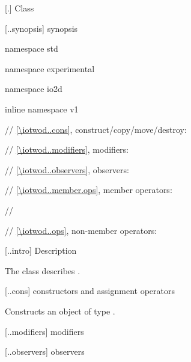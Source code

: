  [\iotwod.] {Class \tcode{}}

 [\iotwod..synopsis] {\tcode{} synopsis}

\begin{codeblock}
namespace std { namespace experimental { namespace io2d { inline namespace v1 {
    // \ref{\iotwod..cons}, construct/copy/move/destroy:

    // \ref{\iotwod..modifiers}, modifiers:
    
    // \ref{\iotwod..observers}, observers:
    
    // \ref{\iotwod..member.ops}, member operators:
    
// \expos
  
  // \ref{\iotwod..ops}, non-member operators:
} } } }
\end{codeblock}

 [\iotwod..intro] {\tcode{} Description}

\pnum
\indexlibrary{\idxcode{}}
The class \tcode{} describes .

 [\iotwod..cons] {\tcode{} constructors and assignment operators}

\begin{itemdecl}
\end{itemdecl}
\begin{itemdescr}
	\pnum
	\effects
	Constructs an object of type \tcode{}.
	
	\pnum
	\postconditions
	
\end{itemdescr}

 [\iotwod..modifiers] {\tcode{} modifiers}

\indexlibrary{\idxcode{}!\idxcode{}}
\indexlibrary{\idxcode{}!\idxcode{}}
\begin{itemdecl}
\end{itemdecl}
\begin{itemdescr}
	\pnum
	\postconditions
	
\end{itemdescr}

 [\iotwod..observers] {\tcode{} observers}

\indexlibrary{\idxcode{}!\idxcode{}}
\indexlibrary{\idxcode{}!\idxcode{}}
\begin{itemdecl}
\end{itemdecl}
\begin{itemdescr}
	\pnum
	\returns

\end{itemdescr}

